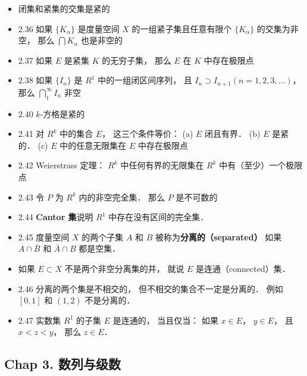 \begin{itemize}
\item 闭集和紧集的交集是紧的

\item 2.36 如果 $\{K_\alpha\}$ 是度量空间 $X$ 的一组紧子集且任意有限个 $\{K_\alpha\}$ 的交集为非空， 那么 $\bigcap K_\alpha$ 也是非空的

\item 2.37 如果 $E$ 是紧集 $K$ 的无穷子集， 那么 $E$ 在 $K$ 中存在极限点

\item 2.38 如果 $\{I_n\}$ 是 $R^1$ 中的一组闭区间序列， 且 $I_n \supset I_{n+1} (n = 1, 2, 3,\dots)$， 那么 $\bigcap_1^\infty I_n$ 非空

\item 2.40 $k$-方格是紧的

\item 2.41 对 $R^k$ 中的集合 $E$， 这三个条件等价： (a) $E$ 闭且有界． (b) $E$ 是紧的． (c) $E$ 中的任意无限集在 $E$ 中存在极限点

\item 2.42 Weierstrass 定理： $R^k$ 中任何有界的无限集在 $R^k$ 中有（至少）一个极限点

\item 2.43 令 $P$ 为 $R^k$ 内的非空完全集． 那么 $P$ 是不可数的

\item 2.44 \textbf{Cantor 集}说明 $R^1$ 中存在没有区间的完全集．

\item 2.45 度量空间 $X$ 的两个子集 $A$ 和 $B$ 被称为\textbf{分离的（separated）} 如果 $A \cap \bar B$ 和 $\bar A \cap B$ 都是空集．

\item 如果 $E \subset X$ 不是两个非空分离集的并， 就说 $E$ 是连通（connected）集．

\item 2.46 分离的两个集是不相交的， 但不相交的集合不一定是分离的． 例如 $[0,1]$ 和 $(1,2)$ 不是分离的．

\item 2.47 实数集 $R^1$ 的子集 $E$ 是连通的， 当且仅当： 如果 $x\in E$， $y\in E$， 且 $x < z < y$， 那么 $z \in E$．
\end{itemize}

\subsection{Chap 3. 数列与级数}

